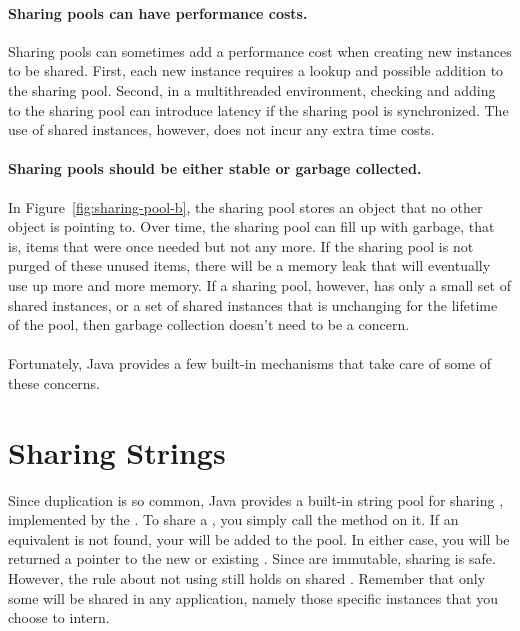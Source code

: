 \paragraph{Sharing pools can have performance costs.}
Sharing pools can sometimes add a performance cost when creating new instances
to be shared.  First, each new instance requires a lookup and possible
addition to the sharing pool. Second, in a multithreaded
environment, checking and adding to the sharing pool can introduce latency if the sharing pool is synchronized.
The use of shared instances, however, does not incur any extra
time costs.

\paragraph{Sharing pools should be either stable or garbage collected.} 
In Figure~\ref{fig:sharing-pool-b}, the sharing pool stores an object
that no other object is pointing to. Over time, the sharing pool can fill up with garbage, that is,
items that were once needed but not any more. If the
sharing pool is not purged of these unused items, there will be a memory
leak that will eventually use up more and more memory. 
If a sharing pool, however, has only a small set of shared instances, or a set
of shared instances that is unchanging for the lifetime of the pool, then
garbage collection doesn't need to be a concern.

\paragraph{}
Fortunately, Java provides a few built-in mechanisms that take care of
some of these concerns.

\section{Sharing Strings}
\label{sec:sharing-strings}


Since  duplication is so common, Java provides a built-in string
pool for sharing , implemented by the \jre. To share a
, you simply call the method  on it.  If an equivalent  is not found, your
 will be added to the pool. In either case, you will be returned a
pointer to the new or existing . 
Since  are immutable, sharing is safe. However,
the rule about not using \code{==} still holds on shared
.  Remember that only some
 will be shared in any application, namely those specific
instances that you choose to intern.

